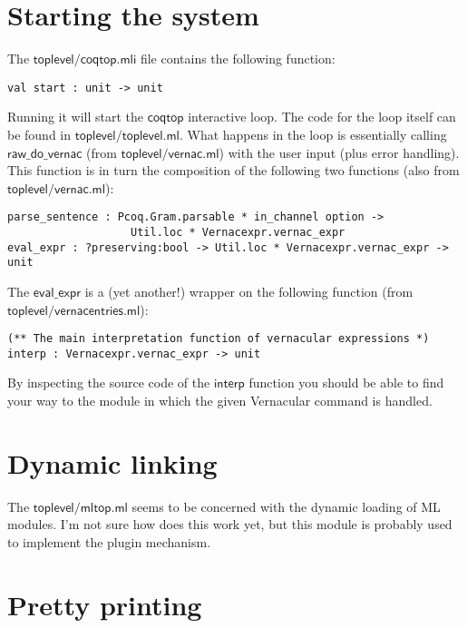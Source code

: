 \documentclass[a4paper,oneside]{book}
\newcommand{\m}[1]{\ensuremath{\mathsf{#1}}}
\begin{document}
\newpage

\section{Starting the system}

The \m{toplevel/coqtop.mli} file contains the following function:

\begin{lstlisting}
val start : unit -> unit
\end{lstlisting}

Running it will start the \m{coqtop} interactive loop. The code for
the loop itself can be found in \m{toplevel/toplevel.ml}. What happens
in the loop is essentially calling \m{raw\_do\_vernac} (from
\m{toplevel/vernac.ml}) with the user input (plus error
handling). This function is in turn the composition of the following
two functions (also from \m{toplevel/vernac.ml}):

\begin{lstlisting}
parse_sentence : Pcoq.Gram.parsable * in_channel option ->
                   Util.loc * Vernacexpr.vernac_expr
eval_expr : ?preserving:bool -> Util.loc * Vernacexpr.vernac_expr -> unit
\end{lstlisting}

\noindent
The \m{eval\_expr} is a (yet another!) wrapper on the following
function (from \m{toplevel/vernacentries.ml}):

\begin{lstlisting}
(** The main interpretation function of vernacular expressions *)
interp : Vernacexpr.vernac_expr -> unit
\end{lstlisting}

\noindent
By inspecting the source code of the \m{interp} function you should be
able to find your way to the module in which the given Vernacular
command is handled.

\newpage

\section{Dynamic linking}

The \m{toplevel/mltop.ml} seems to be concerned with the dynamic
loading of ML modules. I'm not sure how does this work yet, but this
module is probably used to implement the plugin mechanism.

\section{Pretty printing}
\end{document}
